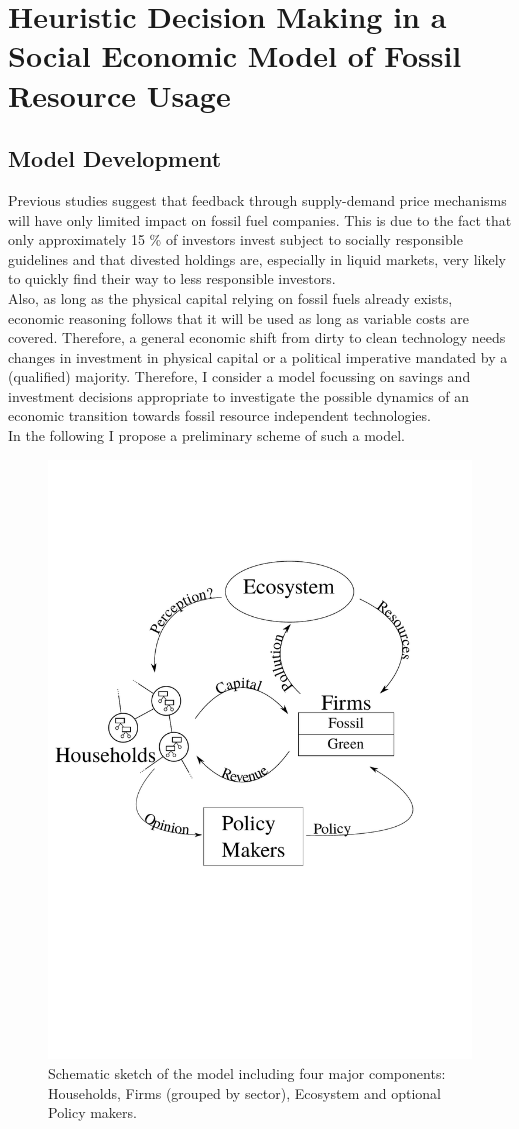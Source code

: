 \chapter{Heuristic Decision Making in a Social Economic Model of Fossil Resource Usage}
\section{Model Development} 

Previous studies \cite{Ans2013} suggest that feedback through supply-demand price mechanisms will have only limited impact on fossil fuel companies. This is due to the fact that only approximately 15 \% of investors invest subject to socially responsible guidelines \cite{SIF2014Report} and that divested holdings are, especially in liquid markets, very likely to quickly find their way to less responsible investors. \\
Also, as long as the physical capital relying on fossil fuels already exists, economic reasoning follows that it will be used as long as variable costs are covered.
Therefore, a general economic shift from dirty to clean technology needs changes in investment in physical capital or a political imperative mandated by a (qualified) majority. Therefore, I consider a model focussing on savings and investment decisions appropriate to investigate the possible dynamics of an economic transition towards fossil resource independent technologies.\\
In the following I propose a preliminary scheme of such a model.

\begin{figure}[t]
	\centering
	\includegraphics[width =.7 \textwidth]{figures/Model_Scheme.pdf}
	\caption{Schematic sketch of the model including four major components: Households, Firms (grouped by sector), Ecosystem and optional Policy makers.}
	\label{fig:model}
\end{figure}

